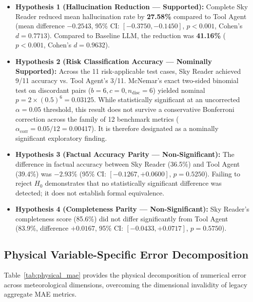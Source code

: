 \documentclass[conference]{IEEEtran}
\begin{document}
\begin{itemize}
    \item \textbf{Hypothesis 1 (Hallucination Reduction --- Supported):} Complete Sky Reader reduced mean hallucination rate by \textbf{27.58\%} compared to Tool Agent (mean difference $-0.2543$, 95\% CI: $[-0.3750, -0.1450]$, $p < 0.001$, Cohen's $d = 0.7713$). Compared to Baseline LLM, the reduction was \textbf{41.16\%} ($p < 0.001$, Cohen's $d = 0.9632$).
    \item \textbf{Hypothesis 2 (Risk Classification Accuracy --- Nominally Supported):} Across the 11 risk-applicable test cases, Sky Reader achieved 9/11 accuracy vs. Tool Agent's 3/11. McNemar's exact two-sided binomial test on discordant pairs ($b=6, c=0, n_{\text{disc}}=6$) yielded nominal $p = 2 \times (0.5)^6 = \mathbf{0.03125}$. While statistically significant at an uncorrected $\alpha = 0.05$ threshold, this result does not survive a conservative Bonferroni correction across the family of 12 benchmark metrics ($\alpha_{\text{corr}} = 0.05 / 12 = 0.00417$). It is therefore designated as a nominally significant exploratory finding.
    \item \textbf{Hypothesis 3 (Factual Accuracy Parity --- Non-Significant):} The difference in factual accuracy between Sky Reader (36.5\%) and Tool Agent (39.4\%) was $-2.93\%$ (95\% CI: $[-0.1267, +0.0600]$, $p = 0.5250$). Failing to reject $H_0$ demonstrates that no statistically significant difference was detected; it does not establish formal equivalence.
    \item \textbf{Hypothesis 4 (Completeness Parity --- Non-Significant):} Sky Reader's completeness score (85.6\%) did not differ significantly from Tool Agent (83.9\%, difference $+0.0167$, 95\% CI: $[-0.0433, +0.0717]$, $p = 0.5750$).
\end{itemize}

\subsection{Physical Variable-Specific Error Decomposition}
Table~\ref{tab:physical_mae} provides the physical decomposition of numerical error across meteorological dimensions, overcoming the dimensional invalidity of legacy aggregate MAE metrics.
\end{document}
